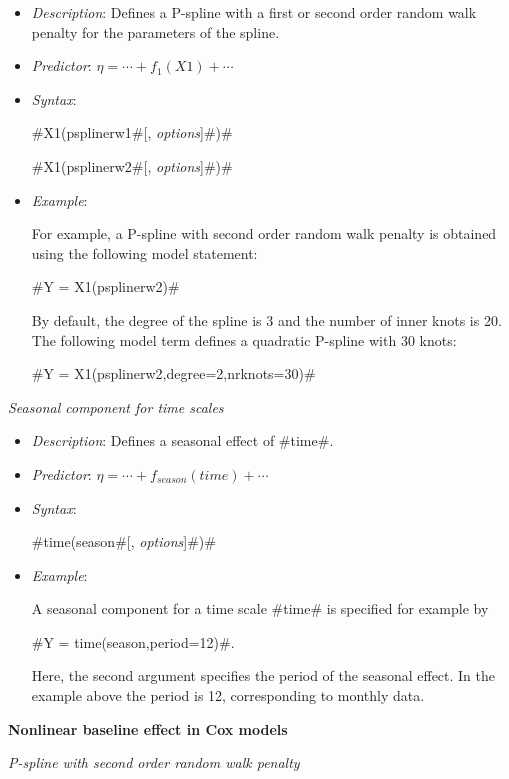 \begin{itemize}
\item[] {\em Description}: Defines a P-spline with a first or second order random walk penalty for
the parameters of the spline.
\item[] {\em Predictor}: $\eta =  \cdots + f_1(X1) + \cdots$
\item[] {\em Syntax}:

#X1(psplinerw1#[, {\em options}]#)#

#X1(psplinerw2#[, {\em options}]#)#
\item[] {\em Example}:

For example, a P-spline with second order random walk penalty is
obtained using the following model statement:

#Y = X1(psplinerw2)#

By default, the degree of the spline is 3 and the number of inner
knots is 20. The following model term defines a quadratic P-spline
with 30 knots:

#Y = X1(psplinerw2,degree=2,nrknots=30)#
\end{itemize}

{\em Seasonal component for time scales}

\begin{itemize}
\item[] {\em Description}: Defines a seasonal effect of #time#.
\item[] {\em Predictor}: $\eta =  \cdots + f_{season}(time) + \cdots $
\item[] {\em Syntax}:

#time(season#[, {\em options}]#)#
\item[] {\em Example}:

A seasonal component for a time scale #time# is specified for
example by

#Y = time(season,period=12)#.

Here, the second argument specifies the period of the seasonal
effect. In the example above the period is 12, corresponding to
monthly data.
\end{itemize}

{\bf Nonlinear baseline effect in Cox models}
\medskip

{\em P-spline with second order random walk penalty}

